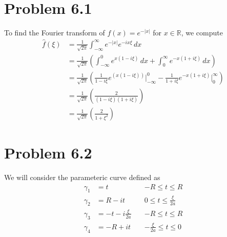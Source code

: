 \documentclass[12pt]{report}
\begin{document}
\maketitle

\section*{Problem 6.1}
To find the Fourier transform of $f(x) = e^{-|x|}$ for $x \in \mathbb{R}$, we compute
\begin{align*}
  \hat{f}(\xi) &= \frac{1}{\sqrt{2\pi}} \int_{-\infty}^\infty e^{-|x|}e^{-ix\xi} \, dx \\
               &= \frac{1}{\sqrt{2\pi}} \left(\int_{-\infty}^0 e^{x(1 - i\xi)} \, dx + \int_0^\infty e^{-x(1 + i\xi)} \, dx\right) \\
               &= \frac{1}{\sqrt{2\pi}} \left(\frac{1}{1-i\xi} e^{(x(1-i\xi))}\big\vert_{-\infty}^0 - \frac{1}{1 + i\xi} e^{-x(1+i\xi)}\big\vert_0^\infty\right) \\
               &= \frac{1}{\sqrt{2\pi}} \left( \frac{2}{(1-i\xi)(1+i\xi)}\right) \\
               &= \frac{1}{\sqrt{2\pi}} \left( \frac{2}{1+\xi^2}\right)
\end{align*}


\section*{Problem 6.2}
We will consider the parameteric curve defined as
\begin{align*}
  \gamma_1 &= t \quad &-R \leq t \leq R \\
  \gamma_2 &= R - it \quad &0 \leq t \leq \frac{\xi}{2a} \\
  \gamma_3 &= -t - i\frac{\xi}{2a} \quad &-R \leq t \leq R \\
  \gamma_4 &= -R + it \quad & -\frac{\xi}{2a} \leq t \leq 0
\end{align*}
\end{document}
